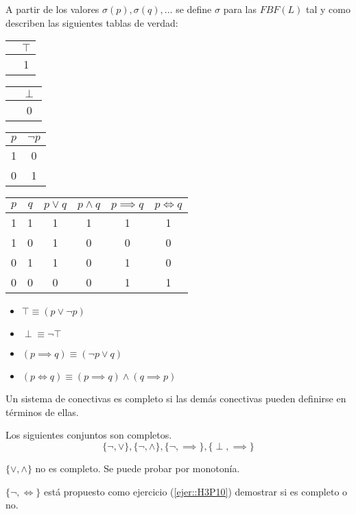 A partir de los valores $\sigma(p), \sigma(q),\hdots$ se define $\sigma$ para las $FBF(L)$ tal y como describen las siguientes tablas de verdad:
\begin{center}
\begin{tabular}{c|c}
	& $\top$\\
	\hline
	& 1 \\
\end{tabular}\hspace{1cm}
\begin{tabular}{c|c}
	& $\perp$\\
	\hline
	& 0 \\
\end{tabular}\hspace{1cm}
\begin{tabular}{|c|c|}
	\hline
	$p$ & $\neg p$\\
	\hline
	1 & 0 \\
	\hline
	0 & 1\\
	\hline
\end{tabular}

\begin{tabular}{|c|c|c|c|c|c|}
	\hline
	$p$ & $q$ & $p\vee q$ & $p \wedge q$ & $p\implies q$ &  $p\iff q$\\
	\hline
	1 & 1 & 1 & 1 & 1 & 1 \\
	\hline
	1 & 0 & 1 & 0 & 0 & 0 \\
	\hline
	0 & 1 & 1 & 0 & 1 & 0 \\
	\hline
	0 & 0 & 0 & 0 & 1 & 1 \\
	\hline
\end{tabular}
\end{center}

\begin{obs}
	\begin{itemize}
	\item $\top \equiv (p\vee \neg p)$
	\item $\perp \equiv \neg \top $
	\item $(p\implies q) \equiv (\neg p \vee q)$
	\item $(p\iff q) \equiv (p\implies q)\wedge (q \implies p)$
	\end{itemize}
\end{obs}

\begin{defn}
	Un sistema de conectivas es completo si las demás conectivas pueden definirse en términos de ellas.
\end{defn}

\begin{example}
	Los siguientes conjuntos son completos.
	$$\{\neg, \vee\}, \{\neg, \wedge\}, \{\neg, \implies\}, \{\perp, \implies\}$$

	$\{\vee,\wedge\}$ no es completo. Se puede probar por monotonía.

	$\{\neg, \iff\}$ está propuesto como ejercicio (\ref{ejer::H3P10}) demostrar si es completo o no.
\end{example}

